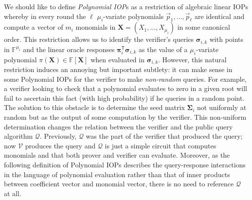 We should like to define \emph{Polynomial IOP}s as a restriction of algebraic linear IOPs whereby in every round the $\ell$ $\mu_i$-variate polynomials $\vec{p}_1, \ldots, \vec{p}_\ell$ are identical and compute a vector of $m_i$ monomials in $\mathbf{X} = (X_1, \ldots, X_{\mu_i})$ in some canonical order. This restriction allows us to identify the verifier's queries $\boldsymbol{\sigma}_{i,k}$ with points in $\mathbb{F}^{\mu_i}$ and the linear oracle responses $\boldsymbol{\pi}_i^\mathsf{T} \boldsymbol{\sigma}_{i,k}$ as the value of a $\mu_i$-variate polynomial $\pi(\mathbf{X}) \in \mathbb{F}[\mathbf{X}]$ when evaluated in $\boldsymbol{\sigma}_{i,k}$. However, this natural restriction induces an annoying but important subtlety: it can make sense in some Polynomial IOPs for the verifier to make \emph{non-random} queries. For example, a verifier looking to check that a polynomial evaluates to zero in a given root will fail to ascertain this fact (with high probability) if he queries in a random point. The solution to this obstacle is to determine the seed matrix $\boldsymbol{\Sigma}_i$ not uniformly at random but as the output of some computation by the verifier. This non-uniform determination changes the relation between the verifier and the public query algorithm $\mathcal{Q}$. Previously, $\mathcal{Q}$ was the part of the verifier that produced the query; now $\mathcal{V}$ produces the query and $\mathcal{Q}$ is just a simple circuit that computes monomials and that both prover and verifier can evaluate. Moreover, as the following definition of Polynomial IOPs describes the query-response interactions in the language of polynomial evaluation rather than that of inner products between coefficient vector and monomial vector, there is no need to reference $\mathcal{Q}$ at all.

